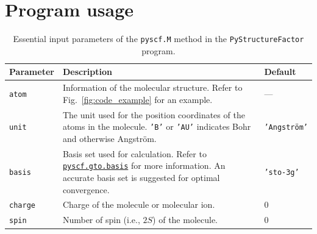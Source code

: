\documentclass[preprint,12pt]{elsarticle} %
\begin{document}
\section{Program usage}
\label{sec:usage}

\begin{table}[tb]
    \small
    \centering
    \begin{tabular}{l p{9cm} l}
        \hline \hline
        Parameter                   & Description                                                                                       & Default\\
        \hline
        \texttt{atom}               & Information of the molecular structure. Refer to Fig.~\ref{fig:code_example} for an example.      & ---\\
        \texttt{unit}               & The unit used for the position coordinates of the atoms in the molecule.
                                      \texttt{'B'} or \texttt{'AU'} indicates Bohr and otherwise Angstr\"om.                            & \texttt{'Angstr\"om'}\\
        \texttt{basis}              & Basis set used for calculation.
                                      Refer to \href{https://pyscf.org/pyscf_api_docs/pyscf.gto.basis.html}{\texttt{pyscf.gto.basis}}
                                      for more information.
                                      An accurate basis set is suggested for optimal convergence.                                       & \texttt{'sto-3g'}\\
        \texttt{charge}             & Charge of the molecule or molecular ion.                                                          & 0 \\
        \texttt{spin}               & Number of spin (i.e., $2S$) of the molecule.                                                      & 0 \\
        \hline \hline
    \end{tabular}
    \caption{Essential input parameters of the \texttt{pyscf.M} method in the \texttt{PyStructureFactor} program.}
    \label{tab:pyscfm_param}
\end{table}
\end{document}
